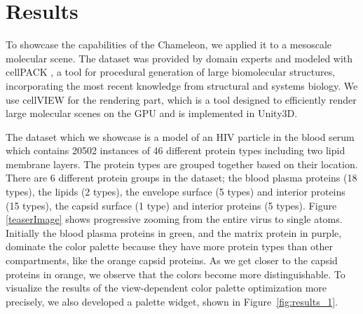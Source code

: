 \documentclass{egpubl}
\begin{document}
		
	\section{Results}
	\label{sec:results}
	
	To showcase the capabilities of the Chameleon, we applied it to a mesoscale molecular scene. 
	The dataset was provided by domain experts and modeled with cellPACK \cite{johnson2015cellpack}, a tool for procedural generation of large biomolecular structures, incorporating the most recent knowledge from structural and systems biology. 
	We use cellVIEW \cite{muzic2015cellview} for the rendering part, which is a tool designed to efficiently render large molecular scenes on the GPU and is implemented in Unity3D. 
	
	The dataset which we showcase is a model of an HIV particle in the blood serum which contains 20502 instances of 46 different protein types including two lipid membrane layers.
	The protein types are grouped together based on their location.
	There are 6 different protein groups in the dataset; the blood plasma proteins (18 types), the lipids (2 types), the envelope surface (5 types) and interior proteins (15 types), the capsid surface (1 type) and interior proteins (5 types).
	Figure \ref{teaserImage} shows progressive zooming from the entire virus to single atoms.	
	Initially the blood plasma proteins in green, and the matrix protein in purple, dominate the color palette because they have more protein types than other compartments, like the orange capsid proteins.	
	As we get closer to the capsid proteins in orange, we observe that the colors become more distinguishable.	
	To visualize the results of the view-dependent color palette optimization more precisely, we also developed a palette widget, shown in Figure~\ref{fig:results_1}.
	
\end{document}
